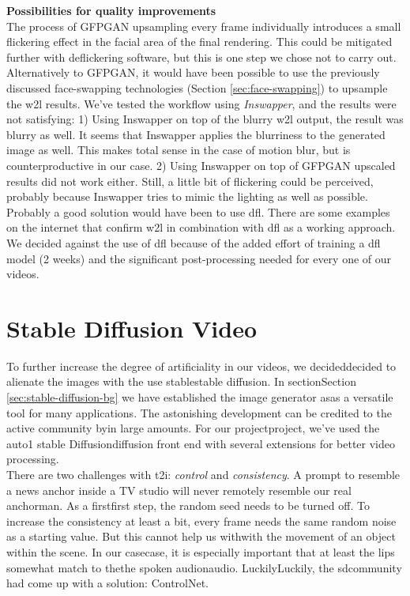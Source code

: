 \documentclass[
  a4paper,  %
  twoside,  %
  bibliography=totoc,
  headsepline,
  cleardoublepage=empty,
  parskip=half,
  draft=false
]{scrbook}
\begin{document}
\textbf{Possibilities for quality improvements} \\
The process of GFPGAN upsampling every frame individually introduces a small flickering effect in the facial area of the final rendering. This could be mitigated further with deflickering software, but this is one step we chose not to carry out. \\ 
Alternatively to GFPGAN, it would have been possible to use the previously discussed face-swapping technologies (Section \ref{sec:face-swapping}) to upsample the \gls{w2l} results. We've tested the workflow using \textit{Inswapper}, and the results were not satisfying: 1) Using Inswapper on top of the blurry \gls{w2l} output, the result was blurry as well. It seems that Inswapper applies the blurriness to the generated image as well. This makes total sense in the case of motion blur, but is counterproductive in our case. 2) Using Inswapper on top of GFPGAN upscaled results did not work either. Still, a little bit of flickering could be perceived, probably because Inswapper tries to mimic the lighting as well as possible. \\
Probably a good solution would have been to use \gls{dfl}. There are some examples on the internet that confirm \gls{w2l} in combination with \gls{dfl} as a working approach. We decided against the use of \gls*{dfl} because of the added effort of training a \gls{dfl} model (2 weeks) and the significant post-processing needed for every one of our videos. 


\section{Stable Diffusion Video}
\label{sec:sd-video}
To further increase the degree of artificiality in our videos, we decideddecided to alienate the images with the use stablestable diffusion. In sectionSection \ref{sec:stable-diffusion-bg} we have established the image generator asas a versatile tool for many applications. The astonishing development can be credited to the active community byin large amounts. For our projectproject, we've used the \gls{auto1} stable Diffusiondiffusion front end with several extensions for better video processing. \\
There are two challenges with \gls{t2i}: \textit{control} and \textit{consistency}. A prompt to resemble a news anchor inside a TV studio will never remotely resemble our real anchorman. As a firstfirst step, the random seed needs to be turned off. To increase the consistency at least a bit, every frame needs the same random noise as a starting value. But this cannot help us withwith the movement of an object within the scene. In our casecase, it is especially important that at least the lips somewhat match to thethe spoken audionaudio. LuckilyLuckily, the \gls{sd}community had come up with a solution: ControlNet.
\end{document}
